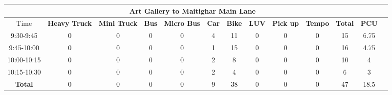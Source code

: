 \begin{landscape}
\begin{table}[h!]
\begin{tabular}{|c|c|c|c|c|c|c|c|c|c|c|c|c|}
    \hline
    \multicolumn{12}{|c|}{\textbf{Art Gallery to Maitighar Main Lane}} \\
    \hline
        Time & \textbf{Heavy Truck} & \textbf{Mini Truck} & \textbf{Bus} & \textbf{Micro Bus} & \textbf{Car} & \textbf{Bike} & \textbf{LUV} & \textbf{Pick up} & \textbf{Tempo} & \textbf{\textbf{Total}} & \textbf{PCU} \\
    \hline
    9:30-9:45	&0	&0	&0	&0	&4	&11	&0	&0	&0	&15	&6.75 \\ \hline
    9:45-10:00	&0	&0	&0	&0	&1	&15	&0	&0	&0	&16	&4.75 \\ \hline
    10:00-10:15	&0	&0	&0	&0	&2	&8	&0	&0	&0	&10	&4 \\ \hline
    10:15-10:30	&0	&0	&0	&0	&2	&4	&0	&0	&0	&6	&3 \\ \hline
    \textbf{Total} & 0 & 0 & 0 & 0 & 9 & 38 & 0 & 0 & 0 & 47 & 18.5 \\ \hline
\end{tabular}

\end{table}
\end{landscape}


